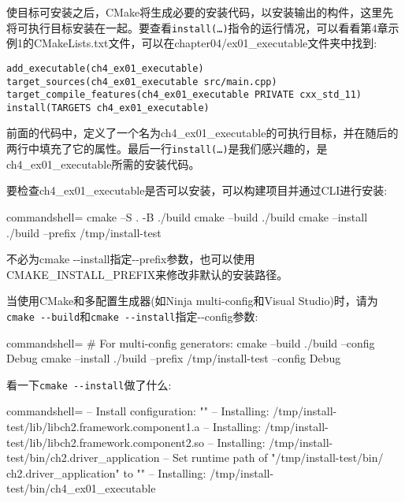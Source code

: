 使目标可安装之后，CMake将生成必要的安装代码，以安装输出的构件，这里先将可执行目标安装在一起。要查看\texttt{install(…)}指令的运行情况，可以看看第4章示例1的CMakeLists.txt文件，可以在chapter04/ex01\_executable文件夹中找到:

\begin{lstlisting}[style=styleCMake]
add_executable(ch4_ex01_executable)
target_sources(ch4_ex01_executable src/main.cpp)
target_compile_features(ch4_ex01_executable PRIVATE cxx_std_11)
install(TARGETS ch4_ex01_executable)
\end{lstlisting}

前面的代码中，定义了一个名为ch4\_ex01\_executable的可执行目标，并在随后的两行中填充了它的属性。最后一行\texttt{install(…)}是我们感兴趣的，是ch4\_ex01\_executable所需的安装代码。

要检查ch4\_ex01\_executable是否可以安装，可以构建项目并通过CLI进行安装:

\begin{tcblisting}{commandshell={}}
cmake –S . -B ./build
cmake --build ./build
cmake --install ./build --prefix /tmp/install-test
\end{tcblisting}

\begin{tcolorbox}[colback=webgreen!5!white,colframe=webgreen!75!black,title=Note]
不必为cmake -{}-install指定-{}-prefix参数，也可以使用CMAKE\_INSTALL\_PREFIX来修改非默认的安装路径。

当使用CMake和多配置生成器(如Ninja multi-config和Visual Studio)时，请为\texttt{cmake -{}-build}和\texttt{cmake -{}-install}指定-{}-config参数:

\begin{tcblisting}{commandshell={}}
# For multi-config generators:
cmake --build ./build --config Debug
cmake --install ./build --prefix /tmp/install-test
--config Debug
\end{tcblisting}
\end{tcolorbox}

看一下\texttt{cmake -{}-install}做了什么:

\begin{tcblisting}{commandshell={}}
-- Install configuration: ""
-- Installing: /tmp/install-test/lib/libch2.framework.component1.a
-- Installing: /tmp/install-test/lib/libch2.framework.component2.so
-- Installing: /tmp/install-test/bin/ch2.driver_application
-- Set runtime path of "/tmp/install-test/bin/
    ch2.driver_application" to ""
-- Installing: /tmp/install-test/bin/ch4_ex01_executable
\end{tcblisting}

